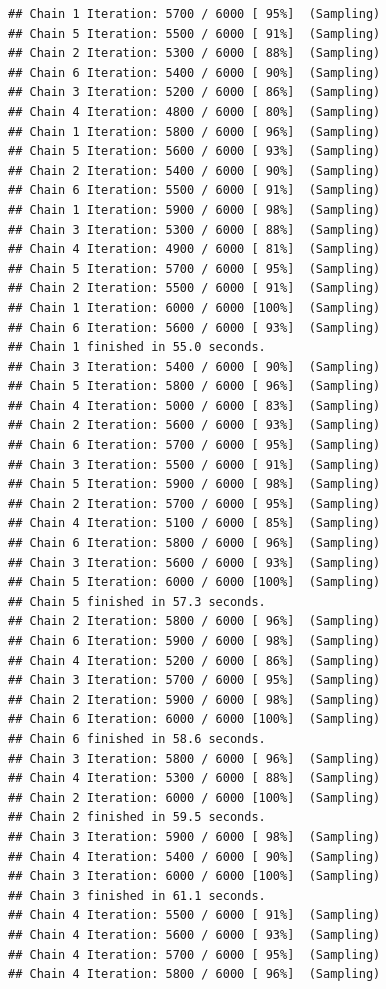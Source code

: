 \documentclass[
]{article}
\begin{document}
\begin{verbatim}
## Chain 1 Iteration: 5700 / 6000 [ 95%]  (Sampling) 
## Chain 5 Iteration: 5500 / 6000 [ 91%]  (Sampling) 
## Chain 2 Iteration: 5300 / 6000 [ 88%]  (Sampling) 
## Chain 6 Iteration: 5400 / 6000 [ 90%]  (Sampling) 
## Chain 3 Iteration: 5200 / 6000 [ 86%]  (Sampling) 
## Chain 4 Iteration: 4800 / 6000 [ 80%]  (Sampling) 
## Chain 1 Iteration: 5800 / 6000 [ 96%]  (Sampling) 
## Chain 5 Iteration: 5600 / 6000 [ 93%]  (Sampling) 
## Chain 2 Iteration: 5400 / 6000 [ 90%]  (Sampling) 
## Chain 6 Iteration: 5500 / 6000 [ 91%]  (Sampling) 
## Chain 1 Iteration: 5900 / 6000 [ 98%]  (Sampling) 
## Chain 3 Iteration: 5300 / 6000 [ 88%]  (Sampling) 
## Chain 4 Iteration: 4900 / 6000 [ 81%]  (Sampling) 
## Chain 5 Iteration: 5700 / 6000 [ 95%]  (Sampling) 
## Chain 2 Iteration: 5500 / 6000 [ 91%]  (Sampling) 
## Chain 1 Iteration: 6000 / 6000 [100%]  (Sampling) 
## Chain 6 Iteration: 5600 / 6000 [ 93%]  (Sampling) 
## Chain 1 finished in 55.0 seconds.
## Chain 3 Iteration: 5400 / 6000 [ 90%]  (Sampling) 
## Chain 5 Iteration: 5800 / 6000 [ 96%]  (Sampling) 
## Chain 4 Iteration: 5000 / 6000 [ 83%]  (Sampling) 
## Chain 2 Iteration: 5600 / 6000 [ 93%]  (Sampling) 
## Chain 6 Iteration: 5700 / 6000 [ 95%]  (Sampling) 
## Chain 3 Iteration: 5500 / 6000 [ 91%]  (Sampling) 
## Chain 5 Iteration: 5900 / 6000 [ 98%]  (Sampling) 
## Chain 2 Iteration: 5700 / 6000 [ 95%]  (Sampling) 
## Chain 4 Iteration: 5100 / 6000 [ 85%]  (Sampling) 
## Chain 6 Iteration: 5800 / 6000 [ 96%]  (Sampling) 
## Chain 3 Iteration: 5600 / 6000 [ 93%]  (Sampling) 
## Chain 5 Iteration: 6000 / 6000 [100%]  (Sampling) 
## Chain 5 finished in 57.3 seconds.
## Chain 2 Iteration: 5800 / 6000 [ 96%]  (Sampling) 
## Chain 6 Iteration: 5900 / 6000 [ 98%]  (Sampling) 
## Chain 4 Iteration: 5200 / 6000 [ 86%]  (Sampling) 
## Chain 3 Iteration: 5700 / 6000 [ 95%]  (Sampling) 
## Chain 2 Iteration: 5900 / 6000 [ 98%]  (Sampling) 
## Chain 6 Iteration: 6000 / 6000 [100%]  (Sampling) 
## Chain 6 finished in 58.6 seconds.
## Chain 3 Iteration: 5800 / 6000 [ 96%]  (Sampling) 
## Chain 4 Iteration: 5300 / 6000 [ 88%]  (Sampling) 
## Chain 2 Iteration: 6000 / 6000 [100%]  (Sampling) 
## Chain 2 finished in 59.5 seconds.
## Chain 3 Iteration: 5900 / 6000 [ 98%]  (Sampling) 
## Chain 4 Iteration: 5400 / 6000 [ 90%]  (Sampling) 
## Chain 3 Iteration: 6000 / 6000 [100%]  (Sampling) 
## Chain 3 finished in 61.1 seconds.
## Chain 4 Iteration: 5500 / 6000 [ 91%]  (Sampling) 
## Chain 4 Iteration: 5600 / 6000 [ 93%]  (Sampling) 
## Chain 4 Iteration: 5700 / 6000 [ 95%]  (Sampling) 
## Chain 4 Iteration: 5800 / 6000 [ 96%]  (Sampling) 

\end{verbatim}
\end{document}
